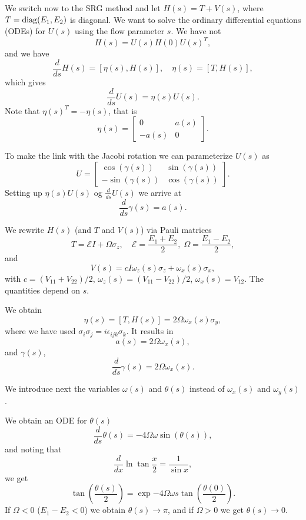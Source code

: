 We switch now to the SRG method and 
let $H(s) = T + V(s)$, where $T= \operatorname{diag}(E_1,E_2)$ is diagonal. We want to solve the ordinary differential equations (ODEs) 
for $U(s)$ using the flow parameter $s$. 
We have not
\[ 
H(s) = U(s)H(0)U(s)^T, 
\]
and we have
\[ 
\frac{d}{ds} H(s) = [\eta(s),H(s)],  \quad \eta(s) = [T,H(s)], 
\]
which gives
\[ 
\frac{d}{ds} U(s) = \eta(s) U(s). 
\]
Note that $\eta(s)^T = -\eta(s)$, that is
\[ 
\eta(s) = \begin{bmatrix} 0 & a(s) \\ -a(s) & 0 \end{bmatrix}. 
\]

To make the link with the Jacobi rotation
we can parameterize $U(s)$ as
\[ 
U = \begin{bmatrix} \cos(\gamma(s)) & \sin(\gamma(s)) \\ -\sin(\gamma(s)) & \cos(\gamma(s)) \end{bmatrix}. 
\]
Setting up $\eta(s)U(s)$ og $\frac{d}{ds} U(s)$ we arrive at 
\[ 
\frac{d}{ds} \gamma(s) = a(s). 
\]

We rewrite $H(s)$ (and $T$ and $V(s)$)  via Pauli matrices
\[ 
T = \mathcal{E} I + \Omega \sigma_z, \quad \mathcal{E} = \frac{E_1
  + E_2}{2}, \; \Omega = \frac{E_1-E_2}{2}, 
\]
and
\[ 
V(s) = c I \omega_z(s)\sigma_z + \omega_x(s)\sigma_x, 
\]
with $c = (V_{11}+V_{22})/2$, $\omega_z(s) = (V_{11}-V_{22})/2$,
$\omega_x(s) = V_12$. The quantities depend on
$s$. 

We obtain
\[ \eta(s) = [T, H(s)] = 2\Omega\omega_x(s)\sigma_y, \]
where we have used $\sigma_i\sigma_j = i\epsilon_{ijk}\sigma_k$.
It results in
\[ a(s) = 2\Omega \omega_x(s), \]
and $\gamma(s)$,
\begin{equation} \frac{d}{ds} \gamma(s) = 2\Omega\omega_x(s). \label{eq:3}\end{equation}

We introduce next the  variables $\omega(s)$ and $\theta(s)$ instead of
$\omega_x(s)$ and $\omega_y(s)$. 

We obtain an ODE for $\theta(s)$ 
\begin{equation} 
\frac{d}{ds} \theta(s) = -4\Omega\omega \sin(\theta(s)), \label{eq:4}
\end{equation}
and noting that
\[ 
\frac{d}{dx} \ln \tan \frac{x}{2} = \frac{1}{\sin x}, 
\]
we get
\[ 
\tan\left(\frac{\theta(s)}{2}\right) = \exp{-4\Omega\omega s} \tan\left(
  \frac{\theta(0)}{2}\right). 
\]
If $\Omega<0$ ($E_1-E_2<0$) we obtain  $\theta(s)\rightarrow \pi$, and if 
$\Omega>0$ we get  $\theta(s)\rightarrow 0$. 


